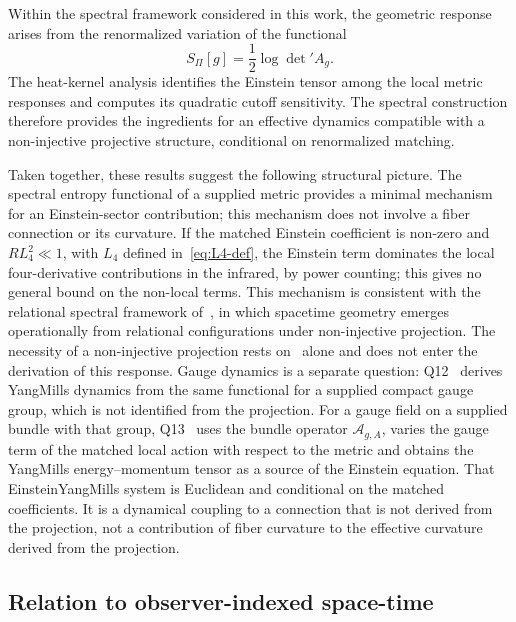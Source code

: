 \documentclass[pdflatex,sn-mathphys-num]{sn-jnl} %
\theoremstyle{remark}
\theoremstyle{plain}
\begin{document}
    Within the spectral framework considered in this work, the geometric response
    arises from the renormalized variation of the functional
    \[
      S_\Pi[g] = \frac12 \log \det{}' A_g .
    \]
    The heat-kernel analysis identifies the Einstein tensor among the local metric responses and computes its
    quadratic cutoff sensitivity.
    The spectral construction therefore provides the ingredients for an effective dynamics compatible with a
    non-injective projective structure, conditional on renormalized matching.

    Taken together, these results suggest the following structural picture.
    The spectral entropy functional of a supplied metric provides a minimal mechanism for an Einstein-sector
    contribution; this mechanism does not involve a fiber connection or its curvature.
    If the matched Einstein coefficient is non-zero and $RL_4^2\ll1$, with $L_4$ defined in~\eqref{eq:L4-def}, the
    Einstein term dominates the local four-derivative contributions in the infrared, by power counting; this gives no
    general bound on the non-local terms.
    This mechanism is consistent with the relational spectral framework
    of~\cite{Beau2026a}, in which spacetime geometry emerges operationally from
    relational configurations under non-injective projection.
    The necessity of a non-injective projection rests on~\cite{Beau2026l} alone and does not enter the derivation of
    this response.
    Gauge dynamics is a separate question: Q12~\cite{Beau2026q12} derives Yang\textendash Mills dynamics from the
    same functional for a supplied compact gauge group, which is not identified from the projection.
    For a gauge field on a supplied bundle with that group, Q13~\cite{Beau2026q13} uses the bundle operator
    $\mathcal{A}_{g,A}$, varies the gauge term of the matched local action with respect to the metric and obtains the
    Yang\textendash Mills energy--momentum tensor as a source of the Einstein equation.
    That Einstein\textendash Yang\textendash Mills system is Euclidean and conditional on the matched coefficients.
    It is a dynamical coupling to a connection that is not derived from the projection, not a contribution of fiber
    curvature to the effective curvature derived from the projection.

  \subsection{Relation to observer-indexed space-time}
    \label{subsec:observer-indexed}
\end{document}
